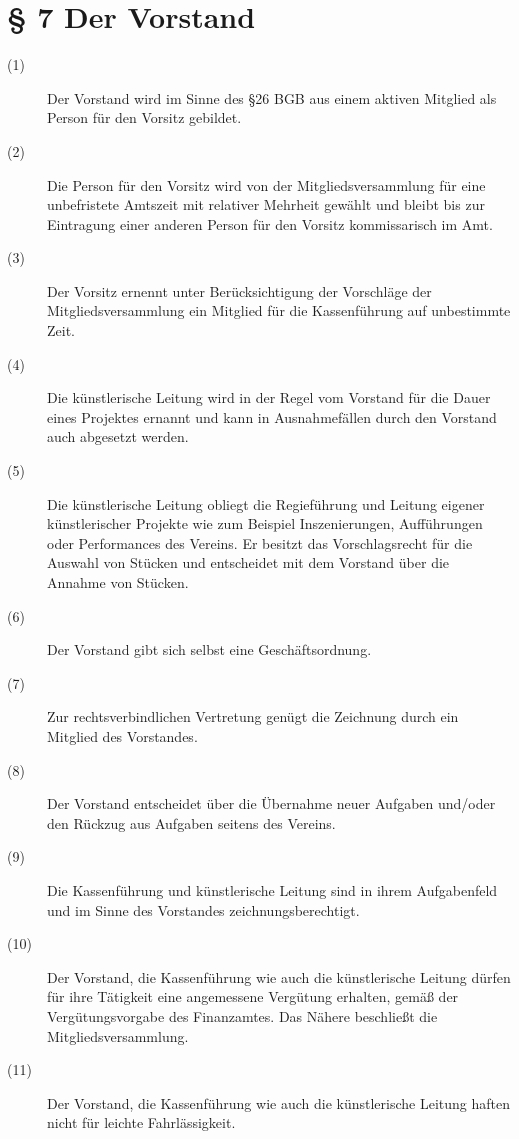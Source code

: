 \documentclass[a4paper,12pt]{scrartcl}
\begin{document}
\section*{\S{} 7 Der Vorstand}
\begin{description} 

\item[(1)] Der Vorstand wird im Sinne des §26 BGB aus einem aktiven Mitglied als Person für den Vorsitz gebildet.
\item[(2)] Die Person für den Vorsitz wird von der Mitgliedsversammlung für eine unbefristete Amtszeit mit relativer Mehrheit gewählt und bleibt bis zur Eintragung einer anderen Person für den Vorsitz kommissarisch im Amt.
\item[(3)] Der Vorsitz ernennt unter Berücksichtigung der Vorschläge der Mitgliedsversammlung ein Mitglied für die Kassenführung auf unbestimmte Zeit.
\item[(4)] Die künstlerische Leitung wird in der Regel vom Vorstand für die Dauer eines Projektes ernannt und kann in Ausnahmefällen durch den Vorstand auch abgesetzt werden.
\item[(5)] Die künstlerische Leitung obliegt die Regieführung und Leitung eigener künstlerischer Projekte wie zum Beispiel Inszenierungen, Aufführungen oder Performances des Vereins. Er besitzt das Vorschlagsrecht für die Auswahl von Stücken und entscheidet mit dem Vorstand über die Annahme von Stücken.
\item[(6)] Der Vorstand gibt sich selbst eine Geschäftsordnung.
\item[(7)] Zur rechtsverbindlichen Vertretung genügt die Zeichnung durch ein Mitglied des Vorstandes.
\item[(8)] Der Vorstand entscheidet über die Übernahme neuer Aufgaben und/oder den Rückzug aus Aufgaben seitens des Vereins.
\item[(9)] Die Kassenführung und künstlerische Leitung sind in ihrem Aufgabenfeld und im Sinne des Vorstandes zeichnungsberechtigt.
\item[(10)] Der Vorstand, die Kassenführung wie auch die künstlerische Leitung dürfen für ihre Tätigkeit eine angemessene Vergütung erhalten, gemäß der Vergütungsvorgabe des Finanzamtes. Das Nähere beschließt die Mitgliedsversammlung.
\item[(11)] Der Vorstand, die Kassenführung wie auch die künstlerische Leitung haften nicht für leichte Fahrlässigkeit.

\end{description}
\end{document}

